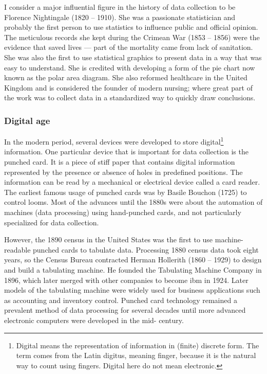 I consider a major influential figure in the history of data
collection to be Florence Nightingale (1820 -- 1910).  She was a passionate statistician
and probably the first person to use statistics to influence public and official
opinion.  The meticulous records she kept during the Crimean War
(1853 -- 1856) were the evidence that saved lives --- part of the mortality came from lack
of sanitation.  She was also the first to use
statistical graphics to present data in a way that was easy to understand.  She is
credited with developing a form of the pie chart now known as the polar area
diagram.  She also reformed healthcare in the United Kingdom and
is considered the founder of modern nursing; where great part of the work was to collect
data in a standardized way to quickly draw conclusions.

\subsubsection{Digital age}

In the modern period, several devices were developed to store digital\footnote{Digital
means the representation of information in (finite) discrete form.  The term comes from the Latin
digitus, meaning finger, because it is the natural way to count using fingers.  Digital
here do not mean electronic.}
information.  One particular device that is important for data collection is the punched
card.  It is a piece of stiff paper that contains digital information represented by the
presence or absence of holes in predefined positions.  The information can be read by a
mechanical or electrical device called a card reader.  The earliest famous usage of
punched cards was by Basile Bouchon (1725) to control looms.  Most of the advances until
the 1880s were about the automation of machines (data processing) using hand-punched cards, and not
particularly specialized for data collection.

However, the 1890 census in the United States was the first to use machine-readable
punched cards to tabulate data. Processing 1880 census data took eight years, so the
Census Bureau contracted Herman Hollerith (1860 -- 1929) to design and build a tabulating
machine.  He founded the Tabulating Machine Company in 1896, which later merged with other
companies to become \gls{ibm} in 1924. Later
models of the tabulating machine were widely used for business applications such as
accounting and inventory control. Punched card technology remained a prevalent method of
data processing for several decades until more advanced electronic computers were
developed in the mid- century.

